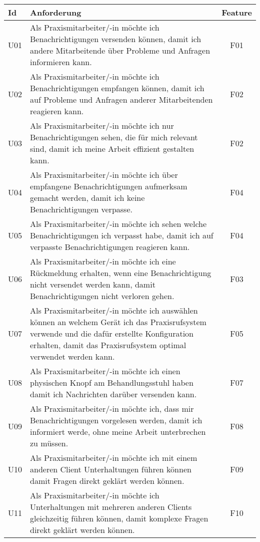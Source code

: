 \begin{table}[h]
    \centering
    \begin{tabular}{|l|p{13cm}|c|}
        \hline
        \textbf{Id} & \textbf{Anforderung}                                                                                                                                                                                         & \textbf{Feature} \\
        \hline
        U01         & Als Praxismitarbeiter/-in möchte ich Benachrichtigungen versenden können, damit ich andere Mitarbeitende über Probleme und Anfragen informieren kann. & F01 \\
        \hline
        U02         & Als Praxismitarbeiter/-in möchte ich Benachrichtigungen empfangen können, damit ich auf Probleme und Anfragen anderer Mitarbeitenden reagieren kann. & F02 \\
        \hline
        U03         & Als Praxismitarbeiter/-in möchte ich nur Benachrichtigungen sehen, die für mich relevant sind, damit ich meine Arbeit effizient gestalten kann. & F02 \\
        \hline
        U04         & Als Praxismitarbeiter/-in möchte ich über empfangene Benachrichtigungen aufmerksam gemacht werden, damit ich keine Benachrichtigungen verpasse. & F04 \\
        \hline
        U05         & Als Praxismitarbeiter/-in möchte ich sehen welche Benachrichtigungen ich verpasst habe, damit ich auf verpasste Benachrichtigungen reagieren kann. & F04 \\
        \hline
        U06         & Als Praxismitarbeiter/-in möchte ich eine Rückmeldung erhalten, wenn eine Benachrichtigung nicht versendet werden kann, damit Benachrichtigungen nicht verloren gehen. & F03 \\
        \hline
        U07         & Als Praxismitarbeiter/-in möchte ich auswählen können an welchem Gerät ich das Praxisrufsystem verwende und die dafür erstellte Konfiguration erhalten, damit das Praxisrufsystem optimal verwendet werden kann. & F05 \\
        \hline
        U08          & Als Praxismitarbeiter/-in möchte ich einen physischen Knopf am Behandlungsstuhl haben damit ich Nachrichten darüber versenden kann. & F07 \\
        \hline
        U09          & Als Praxismitarbeiter/-in möchte ich, dass mir Benachrichtigungen vorgelesen werden, damit ich informiert werde, ohne meine Arbeit unterbrechen zu müssen. & F08 \\
        \hline
        U10         & Als Praxismitarbeiter/-in möchte ich mit einem anderen Client Unterhaltungen führen können damit Fragen direkt geklärt werden können. & F09 \\
        \hline
        U11         & Als Praxismitarbeiter/-in möchte ich Unterhaltungen mit mehreren anderen Clients gleichzeitig führen können, damit komplexe Fragen direkt geklärt werden können. & F10 \\
        \hline
    \end{tabular}\label{tab:userstories1}
\end{table}

